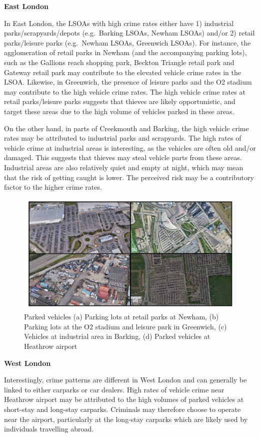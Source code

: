 \documentclass[]{article}
\begin{document}
\textbf{East London}

In East London, the LSOAs with high crime rates either have 1)
industrial parks/scrapyards/depots (e.g.~Barking LSOAs, Newham LSOAs)
and/or 2) retail parks/leisure parks (e.g.~Newham LSOAs, Greenwich
LSOAs). For instance, the agglomeration of retail parks in Newham (and
the accompanying parking lots), such as the Gallions reach shopping
park, Beckton Triangle retail park and Gateway retail park may
contribute to the elevated vehicle crime rates in the LSOA. Likewise, in
Greenwich, the presence of leisure parks and the O2 stadium may
contribute to the high vehicle crime rates. The high vehicle crime rates
at retail parks/leisure parks suggests that thieves are likely
opportunistic, and target these areas due to the high volume of vehicles
parked in these areas.

On the other hand, in parts of Creekmouth and Barking, the high vehicle
crime rates may be attributed to industrial parks and scrapyards. The
high rates of vehicle crime at industrial areas is interesting, as the
vehicles are often old and/or damaged. This suggests that thieves may
steal vehicle parts from these areas. Industrial areas are also
relatively quiet and empty at night, which may mean that the risk of
getting caught is lower. The perceived risk may be a contributory factor
to the higher crime rates.

\begin{figure}
\centering
\includegraphics{pictures/parkedcars.png}
\caption{Parked vehicles (a) Parking lots at retail parks at Newham, (b)
Parking lots at the O2 stadium and leisure park in Greenwich, (c)
Vehicles at industrial area in Barking, (d) Parked vehicles at Heathrow
airport}
\end{figure}

\textbf{West London}

Interestingly, crime patterns are different in West London and can
generally be linked to either carparks or car dealers. High rates of
vehicle crime near Heathrow airport may be attributed to the high
volumes of parked vehicles at short-stay and long-stay carparks.
Criminals may therefore choose to operate near the airport, particularly
at the long-stay carparks which are likely used by individuals
travelling abroad.
\end{document}
